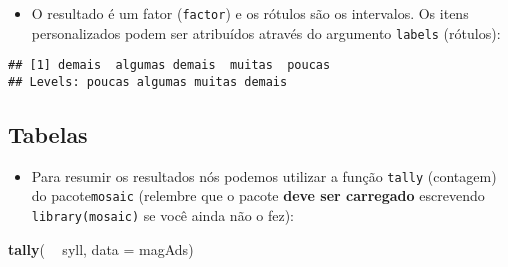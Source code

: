 \documentclass[]{article}
\newenvironment{Shaded}{\begin{snugshade}}{\end{snugshade}}
\newcommand{\KeywordTok}[1]{\textcolor[rgb]{0.13,0.29,0.53}{\textbf{#1}}}
\newcommand{\DataTypeTok}[1]{\textcolor[rgb]{0.13,0.29,0.53}{#1}}
\newcommand{\DecValTok}[1]{\textcolor[rgb]{0.00,0.00,0.81}{#1}}
\newcommand{\StringTok}[1]{\textcolor[rgb]{0.31,0.60,0.02}{#1}}
\newcommand{\CommentTok}[1]{\textcolor[rgb]{0.56,0.35,0.01}{\textit{#1}}}
\newcommand{\OperatorTok}[1]{\textcolor[rgb]{0.81,0.36,0.00}{\textbf{#1}}}
\newcommand{\NormalTok}[1]{#1}
\providecommand{\tightlist}{%
  \setlength{\itemsep}{0pt}\setlength{\parskip}{0pt}}
\begin{document}
\begin{itemize}
\tightlist
\item
  O resultado é um fator (\texttt{factor}) e os rótulos são os
  intervalos. Os itens personalizados podem ser atribuídos através do
  argumento \texttt{labels} (rótulos):
\end{itemize}

\begin{Shaded}
\end{Shaded}

\begin{verbatim}
## [1] demais  algumas demais  muitas  poucas 
## Levels: poucas algumas muitas demais
\end{verbatim}

\begin{Shaded}
\end{Shaded}

\subsection{Tabelas}\label{tabelas}

\begin{itemize}
\tightlist
\item
  Para resumir os resultados nós podemos utilizar a função
  \texttt{tally} (contagem) do pacote\texttt{mosaic} (relembre que o
  pacote \textbf{deve ser carregado} escrevendo \texttt{library(mosaic)}
  se você ainda não o fez):
\end{itemize}

\begin{Shaded}
\begin{Highlighting}[]
\KeywordTok{tally}\NormalTok{( }\OperatorTok{~}\StringTok{ }\NormalTok{syll, }\DataTypeTok{data =}\NormalTok{ magAds)}
\end{Highlighting}
\end{Shaded}
\end{document}
